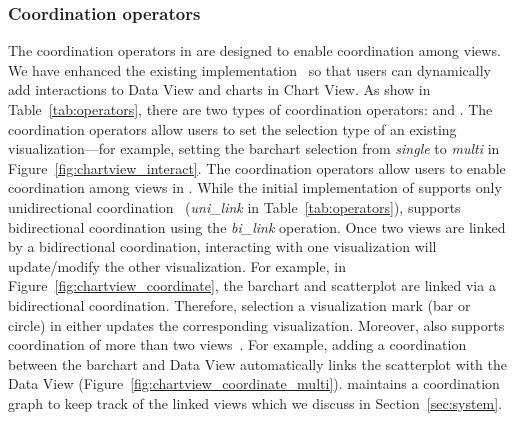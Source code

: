 \subsubsection{Coordination operators}
The coordination operators in \vta are designed to enable coordination among views. We have enhanced the existing \vta implementation~\cite{rahman2020leam} so that users can dynamically add interactions to Data View and charts in Chart View. As show in Table~\ref{tab:operators}, there are two types of coordination operators:  and . The  coordination operators allow users to set the selection type of an existing visualization---for example, setting the barchart selection from \emph{single} to \emph{multi} in Figure~\ref{fig:chartview_interact}. The  coordination operators allow users to enable coordination among views in \system. While the initial implementation of \vta supports only unidirectional coordination~\cite{rahman2020leam} (\emph{uni\_link} in Table~\ref{tab:operators}), \system supports bidirectional coordination using the \emph{bi\_link} operation. Once two views are linked by a bidirectional coordination, interacting with one visualization will update/modify the other visualization. For example, in Figure~\ref{fig:chartview_coordinate}, the barchart and scatterplot are linked via a bidirectional coordination. Therefore, selection a visualization mark (\ie bar or circle) in either updates the corresponding visualization. Moreover, \system also supports coordination of more than two views~\cite{rahman2020leam}. For example, adding a coordination between the barchart and Data View automatically links the scatterplot with the Data View (Figure~\ref{fig:chartview_coordinate_multi}). \system maintains a coordination graph to keep track of the linked views which we discuss in Section~\ref{sec:system}.

